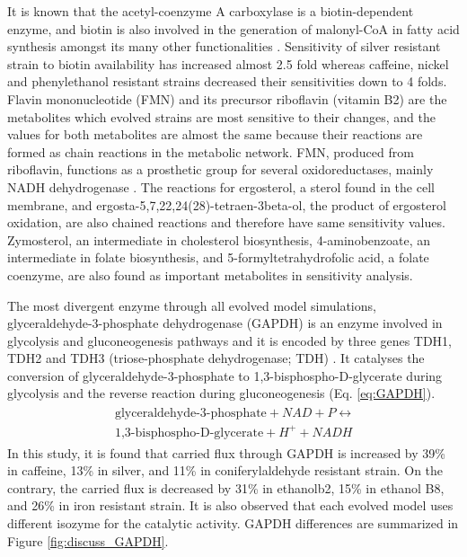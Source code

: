 It is known that the acetyl-coenzyme A carboxylase is a biotin-dependent enzyme, and biotin is also involved in the generation of malonyl-CoA in fatty acid synthesis amongst its many other functionalities \cite{hasslacher1993acetyl, morris1987yeast}. Sensitivity of silver resistant strain to biotin availability has increased almost 2.5 fold whereas caffeine, nickel and phenylethanol resistant strains decreased their sensitivities down to 4 folds. Flavin mononucleotide (FMN) and its precursor riboflavin (vitamin B2) are the metabolites which evolved strains are most sensitive to their changes, and the values for both metabolites are almost the same because their reactions are formed as chain reactions in the metabolic network. FMN, produced from riboflavin, functions as a prosthetic group for several oxidoreductases, mainly NADH dehydrogenase \cite{tsibris1966studies}. The reactions for ergosterol, a sterol found in the cell membrane, and ergosta-5,7,22,24(28)-tetraen-3beta-ol, the product of ergosterol oxidation, are also chained reactions and therefore have same sensitivity values. Zymosterol, an intermediate in cholesterol biosynthesis, 4-aminobenzoate, an intermediate in folate biosynthesis, and 5-formyltetrahydrofolic acid, a folate coenzyme, are also found as important metabolites in sensitivity analysis.

The most divergent enzyme through all evolved model simulations, glyceraldehyde-3-phosphate dehydrogenase (GAPDH) is an enzyme involved in glycolysis and gluconeogenesis pathways and it is encoded by three genes TDH1, TDH2 and TDH3 (triose-phosphate dehydrogenase; TDH) \cite{boucherie1995differential}. It catalyses the conversion of glyceraldehyde-3-phosphate to 1,3-bisphospho-D-glycerate during glycolysis and the reverse reaction during gluconeogenesis (Eq. \ref{eq:GAPDH}).
\begin{align}
\label{eq:GAPDH}
\begin{split}
\ \text{glyceraldehyde-3-phosphate} + NAD + P \leftrightarrow \\
\ \text{1,3-bisphospho-D-glycerate} + H^+ + NADH
\end{split}
\end{align}
In this study, it is found that carried flux through GAPDH is increased by 39\% in caffeine, 13\% in silver, and 11\% in coniferylaldehyde resistant strain. On the contrary, the carried flux is decreased by 31\% in ethanolb2, 15\% in ethanol B8, and 26\% in iron resistant strain. It is also observed that each evolved model uses different isozyme for the catalytic activity. GAPDH differences are summarized in Figure \ref{fig:discuss_GAPDH}.

